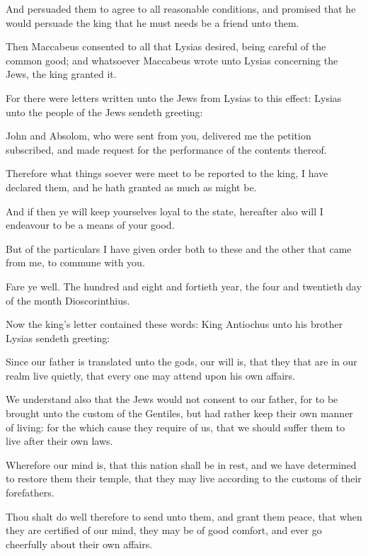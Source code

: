 {\par }{\PP {}And persuaded them to agree to all reasonable conditions, and promised that he would persuade the king that he must needs be a friend unto them.
\par }{\PP {}Then Maccabeus consented to all that Lysias desired, being careful of the common good; and whatsoever Maccabeus wrote unto Lysias concerning the Jews, the king granted it.
\par }{\PP {}For there were letters written unto the Jews from Lysias to this effect: Lysias unto the people of the Jews sendeth greeting:
\par }{\PP {}John and Absolom, who were sent from you, delivered me the petition subscribed, and made request for the performance of the contents thereof.
\par }{\PP {}Therefore what things soever were meet to be reported to the king, I have declared them, and he hath granted as much as might be.
\par }{\PP {}And if then ye will keep yourselves loyal to the state, hereafter also will I endeavour to be a means of your good.
\par }{\PP {}But of the particulars I have given order both to these and the other that came from me, to commune with you.
\par }{\PP {}Fare ye well. The hundred and eight and fortieth year, the four and twentieth day of the month Dioscorinthius.
\par }{\PP {}Now the king’s letter contained these words: King Antiochus unto his brother Lysias sendeth greeting:
\par }{\PP {}Since our father is translated unto the gods, our will is, that they that are in our realm live quietly, that every one may attend upon his own affairs.
\par }{\PP {}We understand also that the Jews would not consent to our father, for to be brought unto the custom of the Gentiles, but had rather keep their own manner of living: for the which cause they require of us, that we should suffer them to live after their own laws.
\par }{\PP {}Wherefore our mind is, that this nation shall be in rest, and we have determined to restore them their temple, that they may live according to the customs of their forefathers.
\par }{\PP {}Thou shalt do well therefore to send unto them, and grant them peace, that when they are certified of our mind, they may be of good comfort, and ever go cheerfully about their own affairs.
}
